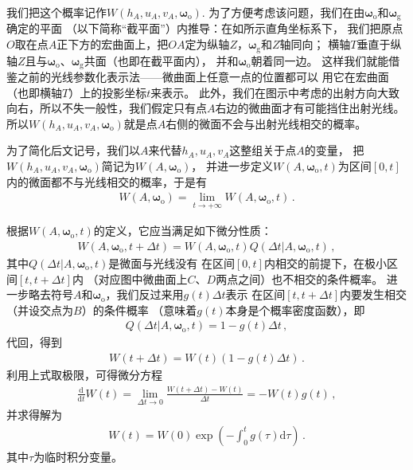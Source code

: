 我们把这个概率记作$W(h_A,u_A,v_A,{\bm\omega}_{\mathrm{o}})$.
为了方便考虑该问题，我们在由${\bm\omega}_{\mathrm{o}}$和${\bm\omega}_{\mathrm{g}}$确定的平面
（以下简称“截平面”）内推导：在如所示直角坐标系下，
我们把原点$O$取在点$A$正下方的宏曲面上，把$OA$定为纵轴$Z$，${\bm\omega}_{\mathrm{g}}$和$Z$轴同向；
横轴$T$垂直于纵轴$Z$且与${\bm\omega}_{\mathrm{o}}$、${\bm\omega}_{\mathrm{g}}$共面（也即在截平面内），
并和${\bm\omega}_{\mathrm{o}}$朝着同一边。
这样我们就能借鉴之前的光线参数化表示法——微曲面上任意一点的位置都可以
用它在宏曲面（也即横轴$T$）上的投影坐标$t$来表示。
此外，我们在图示中考虑的出射方向大致向右，所以不失一般性，我们假定只有点$A$右边的微曲面才有可能挡住出射光线。
所以$W(h_A,u_A,v_A,{\bm\omega}_{\mathrm{o}})$就是点$A$右侧的微面不会与出射光线相交的概率。

为了简化后文记号，我们以$A$来代替$h_A,u_A,v_A$这整组关于点$A$的变量，
把$W(h_A,u_A,v_A,{\bm\omega}_{\mathrm{o}})$简记为$W(A,{\bm\omega}_{\mathrm{o}})$，
并进一步定义$W(A,{\bm\omega}_{\mathrm{o}},t)$为区间$[0,t]$内的微面都不与光线相交的概率，于是有
\begin{align}\label{eq:08ex01-W-definition}
    W(A,{\bm\omega}_{\mathrm{o}})=\lim\limits_{t\to +\infty}W(A,{\bm\omega}_{\mathrm{o}},t)\, .
\end{align}

根据$W(A,{\bm\omega}_{\mathrm{o}},t)$的定义，它应当满足如下微分性质：
\begin{align}\label{eq:08ex01-VisiblePointProbability}
    W(A,{\bm\omega}_{\mathrm{o}},t+\Delta t)
    =W(A,{\bm\omega}_{\mathrm{o}},t)
    Q(\Delta t|A,{\bm\omega}_{\mathrm{o}},t)\, ,
\end{align}
其中$Q(\Delta t|A,{\bm\omega}_{\mathrm{o}},t)$是微面与光线没有
在区间$[0,t]$内相交的前提下，在极小区间$[t,t+\Delta t]$内
（对应图中微曲面上$C$、$D$两点之间）也不相交的条件概率。
进一步略去符号$A$和${\bm\omega}_{\mathrm{o}}$，我们反过来用$g(t)\Delta t$表示
在区间$[t,t+\Delta t]$内要发生相交（并设交点为$B$）的条件概率
（意味着$g(t)$本身是个概率密度函数），即
\begin{align}
    Q(\Delta t|A,{\bm\omega}_{\mathrm{o}},t)=1-g(t)\Delta t\, ,
\end{align}
代回，得到
\begin{align}
    W(t+\Delta t)=W(t)(1-g(t)\Delta t)\, .
\end{align}
利用上式取极限，可得微分方程
\begin{align}
    \frac{\mathrm{d}}{\mathrm{d}t}W(t)=\lim\limits_{\Delta t\to 0}\frac{W(t+\Delta t)-W(t)}{\Delta t}=-W(t)g(t)\, ,
\end{align}
并求得解为
\begin{align}\label{eq:08ex01-WtSolution}
    W(t)=W(0)\exp\left(-\int_{0}^{t}g(\tau)\mathrm{d}\tau\right)\, .
\end{align}
其中$\tau$为临时积分变量。

